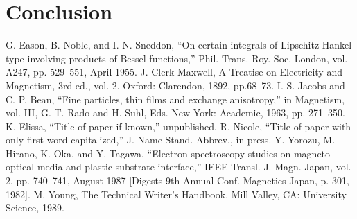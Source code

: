 \documentclass[conference]{IEEEtran}
\begin{document}
\section{Conclusion}

\begin{thebibliography}{00}
 G. Eason, B. Noble, and I. N. Sneddon, ``On certain integrals of Lipschitz-Hankel type involving products of Bessel functions,'' Phil. Trans. Roy. Soc. London, vol. A247, pp. 529--551, April 1955.
 J. Clerk Maxwell, A Treatise on Electricity and Magnetism, 3rd ed., vol. 2. Oxford: Clarendon, 1892, pp.68--73.
 I. S. Jacobs and C. P. Bean, ``Fine particles, thin films and exchange anisotropy,'' in Magnetism, vol. III, G. T. Rado and H. Suhl, Eds. New York: Academic, 1963, pp. 271--350.
 K. Elissa, ``Title of paper if known,'' unpublished.
 R. Nicole, ``Title of paper with only first word capitalized,'' J. Name Stand. Abbrev., in press.
 Y. Yorozu, M. Hirano, K. Oka, and Y. Tagawa, ``Electron spectroscopy studies on magneto-optical media and plastic substrate interface,'' IEEE Transl. J. Magn. Japan, vol. 2, pp. 740--741, August 1987 [Digests 9th Annual Conf. Magnetics Japan, p. 301, 1982].
 M. Young, The Technical Writer's Handbook. Mill Valley, CA: University Science, 1989.
\end{thebibliography}
\end{document}
